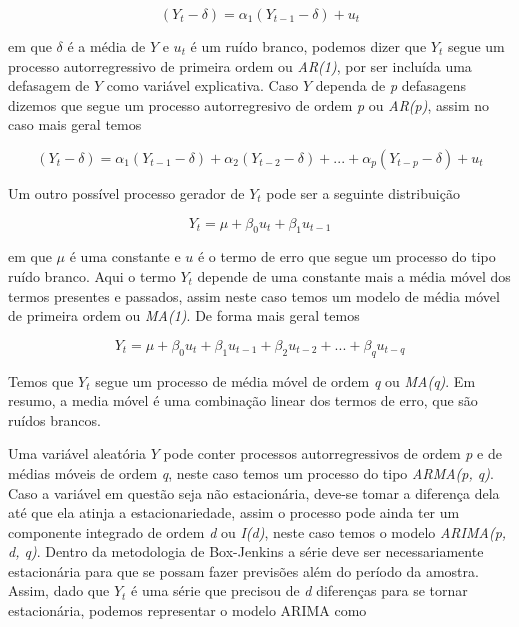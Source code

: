 \documentclass[twocolumn]{rbef}
\newcommand{\1}{\mathbbm{1}}
\begin{document}
\begin{equation}
    (Y_{t} - \delta) = \alpha_{1} (Y_{t-1} - \delta) + u_{t}
\end{equation}

em que $\delta$ é a média de $Y$ e $u_{t}$ é um ruído branco, podemos dizer que $Y_{t}$ segue um processo autorregressivo de primeira ordem ou \textit{AR(1)}, por ser incluída uma defasagem de $Y$ como variável explicativa. Caso $Y$ dependa de \textit{p} defasagens dizemos que segue um processo autorregresivo de ordem \textit{p} ou \textit{AR(p)}, assim no caso mais geral temos

\begin{equation}
    (Y_{t} - \delta) = \alpha_{1} (Y_{t-1} - \delta) + \alpha_{2} (Y_{t-2} - \delta)+ ... + \alpha_{p} (Y_{t-p} - \delta) + u_{t}
\end{equation}

Um outro possível processo gerador de $Y_{t}$ pode ser a seguinte distribuição

\begin{equation}
    Y_{t} = \mu + \beta_{0} u_{t} + \beta_{1} u_{t-1}
\end{equation}

em que $\mu$ é uma constante e $u$ é o termo de erro que segue um processo do tipo ruído branco. Aqui o termo $Y_{t}$ depende de uma constante mais a média móvel dos termos presentes e passados, assim neste caso temos um modelo de média móvel de primeira ordem ou \textit{MA(1)}. De forma mais geral temos

\begin{equation}
    Y_{t} = \mu + \beta_{0} u_{t} + \beta_{1} u_{t-1} + \beta_{2} u_{t-2} + ... + \beta_{q} u_{t-q}
\end{equation}

Temos que $Y_{t}$ segue um processo de média móvel de ordem \textit{q} ou \textit{MA(q)}. Em resumo, a media móvel é uma combinação linear dos termos de erro, que são ruídos brancos.

Uma variável aleatória $Y$ pode conter processos autorregressivos de ordem \textit{p} e de médias móveis de ordem \textit{q}, neste caso temos um processo do tipo \textit{ARMA(p, q)}. Caso a variável em questão seja não estacionária, deve-se tomar a diferença dela até que ela atinja a estacionariedade, assim o processo pode ainda ter um componente integrado de ordem \textit{d} ou \textit{I(d)}, neste caso temos o modelo \textit{ARIMA(p, d, q)}. Dentro da metodologia de Box-Jenkins\cite{Box-Jenkins} a série deve ser necessariamente estacionária para que se possam fazer previsões além do período da amostra. Assim, dado que $Y_{t}$ é uma série que precisou de \textit{d} diferenças para se tornar estacionária, podemos representar o modelo ARIMA como
\end{document}

